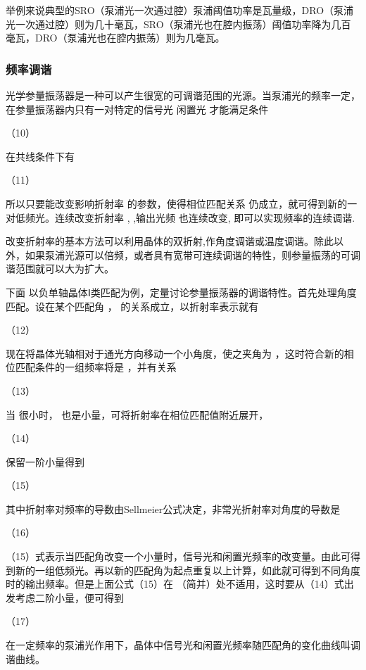 举例来说典型的SRO（泵浦光一次通过腔）泵浦阈值功率是瓦量级，DRO（泵浦光一次通过腔）则为几十毫瓦，SRO（泵浦光也在腔内振荡）阈值功率降为几百毫瓦，DRO（泵浦光也在腔内振荡）则为几毫瓦。

\subsubsection{频率调谐}

光学参量振荡器是一种可以产生很宽的可调谐范围的光源。当泵浦光的频率一定，在参量振荡器内只有一对特定的信号光 闲置光 才能满足条件

                                   （10）          

在共线条件下有

                           （11）                    

所以只要能改变影响折射率 的参数，使得相位匹配关系 仍成立，就可得到新的一对低频光。连续改变折射率 , ,输出光频 也连续改变, 即可以实现频率的连续调谐.

改变折射率的基本方法可以利用晶体的双折射,作角度调谐或温度调谐。除此以外，如果泵浦光源可以倍频，或者具有宽带可连续调谐的特性，则参量振荡的可调谐范围就可以大为扩大。

下面 以负单轴晶体Ⅰ类匹配为例，定量讨论参量振荡器的调谐特性。首先处理角度匹配。设在某个匹配角 ， 的关系成立，以折射率表示就有

                          （12）               

现在将晶体光轴相对于通光方向移动一个小角度，使之夹角为 ，这时符合新的相位匹配条件的一组频率将是 ，并有关系

               （13）       

当 很小时， 也是小量，可将折射率在相位匹配值附近展开，

    （14）       

保留一阶小量得到

           （15）     

其中折射率对频率的导数由Sellmeier公式决定，非常光折射率对角度的导数是

         （16）              

（15）式表示当匹配角改变一个小量时，信号光和闲置光频率的改变量。由此可得到新的一组低频光。再以新的匹配角为起点重复以上计算，如此就可得到不同角度时的输出频率。但是上面公式（15）在  （简并）处不适用，这时要从（14）式出发考虑二阶小量，便可得到

                  （17）         

在一定频率的泵浦光作用下，晶体中信号光和闲置光频率随匹配角的变化曲线叫调谐曲线。

